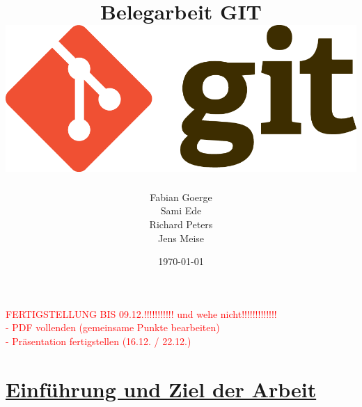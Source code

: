 \documentclass[a4paper]{article}
\begin{document}
\title{\textbf{{\Huge { Belegarbeit GIT \vspace{2cm}} 
\includegraphics[width=\textwidth]{git-logo.png}	%
\vspace{2cm} }}}
\author{Fabian Goerge \\  Sami Ede  \\ Richard Peters \\ Jens Meise}
\date{\today}
\maketitle
\thispagestyle{empty} 								%


\newpage

\setcounter{page}{1} 								%
\tableofcontents									%


\newpage

\textcolor{red}
{
	FERTIGSTELLUNG BIS 09.12.!!!!!!!!!!! 
	und wehe nicht!!!!!!!!!!!!!\\
	- PDF vollenden (gemeinsame Punkte bearbeiten)\\
	- Präsentation fertigstellen (16.12. / 22.12.)
}
\section{\underline{Einführung und Ziel der Arbeit}} 	%
\end{document}
